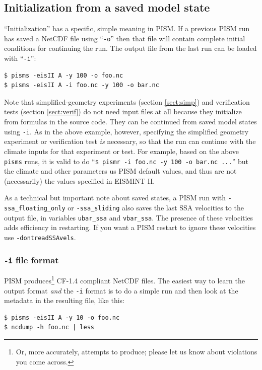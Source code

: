 \documentclass[titlepage,letterpaper,final]{scrartcl}
\begin{document}
\subsection{Initialization from a saved model state}  ``Initialization'' has a specific, simple meaning in PISM.  If a previous PISM run has saved a NetCDF file using ``\texttt{-o}'' then that file will contain complete initial conditions for continuing the run.  The output file from the last run can be loaded with ``\texttt{-i}'': 

\begin{verbatim}
$ pisms -eisII A -y 100 -o foo.nc
$ pisms -eisII A -i foo.nc -y 100 -o bar.nc
\end{verbatim}
\smallskip

Note that simplified-geometry experiments (section \ref{sect:simp}) and verification tests (section \ref{sect:verif}) do not need input files at all because they initialize from formulas in the source code.  They can be continued from saved model states using \texttt{-i}.  As in the above example, however, specifying the simplified geometry experiment or verification test \emph{is} necessary, so that the run can continue with the climate inputs for that experiment or test.  For example, based on the above \texttt{pisms} runs, it is valid to do ``\texttt{\$ pismr -i foo.nc -y 100 -o bar.nc ...}'' but the climate and other parameters us PISM default values, and thus are not (necessarily) the values specified in EISMINT II.

As a technical but important note about saved states, a PISM run with \texttt{-ssa_floating_only} or \texttt{-ssa_sliding}
also saves the last SSA velocities to the output file, in variables 
\texttt{ubar_ssa} and \texttt{vbar_ssa}. The presence
of these velocities adds efficiency in restarting.  If you want a PISM restart to
ignore these velocities use \texttt{-dontreadSSAvels}.

\subsubsection*{\texttt{-i} file format}
PISM produces\footnote{Or, more accurately, attempts to produce; please let us know about violations you come across.} CF-1.4 compliant NetCDF files.  The easiest way to learn the output format \emph{and} the \texttt{-i} format is to do a simple run and then look at the metadata in the resulting file, like this:
\begin{verbatim}
$ pisms -eisII A -y 10 -o foo.nc
$ ncdump -h foo.nc | less
\end{verbatim}
\end{document}
